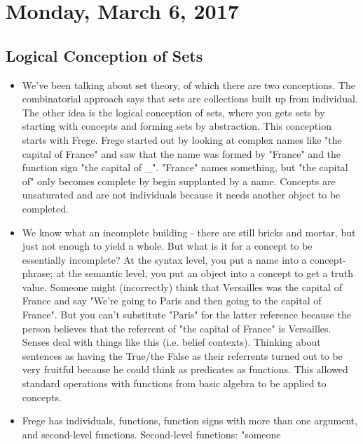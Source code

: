 \documentclass[12pt]{article}
\theoremstyle{definition}
\begin{document}
\section{Monday, March 6, 2017}

\subsection{Logical Conception of Sets}

\begin{itemize}
    \itemsep0em 
    \item
        We've been talking about set theory, of which there are two
        conceptions. The combinatorial approach says that sets are collections
        built up from individual. The other idea is the logical conception of
        sets, where you gets sets by starting with concepts and forming sets by
        abstraction. This conception starts with Frege. Frege started out by
        looking at complex names like "the capital of France" and saw that the
        name was formed by "France" and the function sign "the capital of \_".
        "France" names something, but "the capital of" only becomes complete by
        begin supplanted by a name. Concepts are unsaturated and are not
        individuals because it needs another object to be completed. 
    \item
        We know what an incomplete building - there are still bricks and
        mortar, but just not enough to yield a whole. But what is it for a
        concept to be essentially incomplete? At the syntax level, you put a
        name into a concept-phrase; at the semantic level, you put an object
        into a concept to get a truth value. Someone might (incorrectly) think
        that Versailles was the capital of France and say "We're going to Paris
        and then going to the capital of France". But you can't substitute
        "Paris" for the latter reference because the person believes that the
        referrent of "the capital of France" is Versailles. Senses deal with
        things like this (i.e. belief contexts). Thinking about sentences as
        having the True/the False as their referrents turned out to be very
        fruitful because he could think as predicates as functions. This
        allowed standard operations with functions from basic algebra to be
        applied to concepts.
    \item
        Frege has individuals, functions, function signs with more than one
        argument, and second-level functions. Second-level functions: "someone

\end{itemize}
\end{document}
